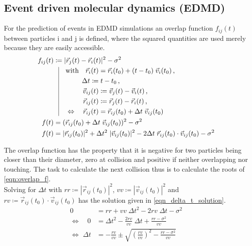 \subsection{Event driven molecular dynamics (EDMD)}
\label{sec:EDMD}
For the prediction of events in EDMD simulations an overlap function $f_{ij}(t)$ between particles i and j is defined, where the squared quantities are used merely because they are easily accessible.\\
\begin{align}
f_{ij}(t) & \coloneqq  | \vec{r}_j(t) - \vec{r}_i(t) |^2 - \sigma^2\\
          & \; \; \, \vrule
  \begin{aligned}[t]
    \quad \text{with} \quad \vec{r}_i(t) &= \vec{r}_i(t_0) + (t-t_0) \; \vec{v}_i(t_0) \, \text{,}\\
    \Delta t \coloneqq & \; t-t_0  \, \text{,} \\ 
    \vec{v}_{ij}(t) &\coloneqq  \vec{v}_j(t) - \vec{v}_i(t) \, \text{,}\\
    \vec{r}_{ij}(t) &\coloneqq  \vec{r}_j(t) - \vec{r}_i(t) \, \text{,}\\
    \Leftrightarrow \quad \vec{r}_{ij}(t) &= \vec{r}_{ij}(t_0) + \Delta t \; \vec{v}_{ij}(t_0)
  \end{aligned}\\
f(t)  & = ( \vec{r}_{ij}(t_0) +  \Delta t \;  \vec{v}_{ij}(t_0))^2 -\sigma^2 \\
\label{eqn:overlap_f}
f(t)  & = |\vec{r}_{ij}(t_0)|^2 + \Delta t ^2 \; |\vec{v}_{ij}(t_0)|^2 - 2 \Delta t \; \vec{r}_{ij}(t_0) \cdot \vec{v}_{ij}(t_0)  -\sigma^2
\end{align}  

The overlap function has the property that it is negative for two particles being closer than their diameter, zero at collision and positive if neither overlapping nor touching. The task to calculate the next collision thus is to calculate the roots of \autoref{eqn:overlap_f}.\\

Solving for $\Delta t$ with $rr \coloneqq |\vec{r}_{ij}(t_0)|^2  $, $vv \coloneqq |\vec{v}_{ij}(t_0)|^2  $ and  $ rv \coloneqq \vec{r}_{ij}(t_0) \cdot \vec{v}_{ij}(t_0) $ has the solution given in \autoref{eqn_delta_t_solution}.
\begin{align}
0 &= rr + vv \; \Delta t ^2  - 2 rv \; \Delta t  -\sigma^2 \nonumber\\
\Leftrightarrow \quad 0 &= \Delta t ^2 - \frac{2rv}{vv} \; \Delta t + \frac{rr - \sigma^2 }{vv} \nonumber\\
\label{eqn_delta_t_solution}
\Leftrightarrow \, \, \Delta t &= - \frac{rv}{vv} \pm \sqrt{\left(\frac{rv}{vv}\right)^2 - \frac{rr - \sigma^2 }{vv}}
\end{align}

